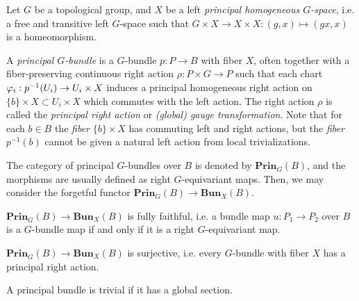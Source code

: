 \documentclass{../../large}
\begin{document}
\begin{prb}
Let $G$ be a topological group, and $X$ be a left \emph{principal homogeneous $G$-space}, i.e. a free and transitive left $G$-space such that $G\times X\to X\times X:(g,x)\mapsto(gx,x)$ is a homeomorphism.

A \emph{principal $G$-bundle} is a $G$-bundle $p:P\to B$ with fiber $X$, often together with a fiber-preserving continuous right action $\rho:P\times G\to P$ such that each chart $\varphi_i:p^{-1}(U_i)\to U_i\times X$ induces a principal homogeneous right action on $\{b\}\times X\subset U_i\times X$ which commutes with the left action.
The right action $\rho$ is called the \emph{principal right action} or \emph{(global) gauge transformation}.
Note that for each $b\in B$ the \emph{fiber} $\{b\}\times X$ has commuting left and right actions, but the \emph{fiber} $p^{-1}(b)$ cannot be given a natural left action from local trivializations.

The category of principal $G$-bundles over $B$ is denoted by $\mathbf{Prin}_G(B)$, and the morphisms are usually defined as right $G$-equivariant maps.
Then, we may consider the forgetful functor $\mathbf{Prin}_G(B)\to\mathbf{Bun}_X(B)$.
\begin{parts}
\item $\mathbf{Prin}_G(B)\to\mathbf{Bun}_X(B)$ is fully faithful, i.e. a bundle map $u:P_1\to P_2$ over $B$ is a $G$-bundle map if and only if it is a right $G$-equivariant map. 
\item $\mathbf{Prin}_G(B)\to\mathbf{Bun}_X(B)$ is surjective, i.e. every $G$-bundle with fiber $X$ has a principal right action.
\item A principal bundle is trivial if it has a global section.
\end{parts}
\end{prb}
\end{document}
